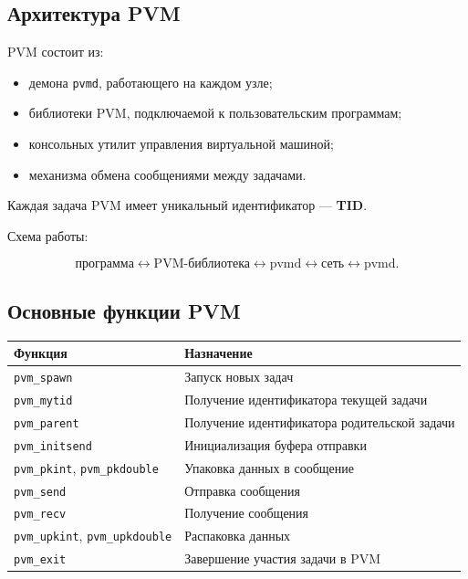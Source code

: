 \documentclass[12pt,a4paper]{article}
\begin{document}
\subsection{Архитектура PVM}

PVM состоит из:
\begin{itemize}
    \item демона \texttt{pvmd}, работающего на каждом узле;
    \item библиотеки PVM, подключаемой к пользовательским программам;
    \item консольных утилит управления виртуальной машиной;
    \item механизма обмена сообщениями между задачами.
\end{itemize}

Каждая задача PVM имеет уникальный идентификатор --- \textbf{TID}.

Схема работы:

\[
\text{программа} \leftrightarrow \text{PVM-библиотека} \leftrightarrow \text{pvmd} \leftrightarrow \text{сеть} \leftrightarrow \text{pvmd}.
\]

\subsection{Основные функции PVM}

\begin{center}
\begin{tabular}{|p{5cm}|p{9cm}|}
\hline
\textbf{Функция} & \textbf{Назначение} \\
\hline
\texttt{pvm\_spawn} & Запуск новых задач \\
\hline
\texttt{pvm\_mytid} & Получение идентификатора текущей задачи \\
\hline
\texttt{pvm\_parent} & Получение идентификатора родительской задачи \\
\hline
\texttt{pvm\_initsend} & Инициализация буфера отправки \\
\hline
\texttt{pvm\_pkint}, \texttt{pvm\_pkdouble} & Упаковка данных в сообщение \\
\hline
\texttt{pvm\_send} & Отправка сообщения \\
\hline
\texttt{pvm\_recv} & Получение сообщения \\
\hline
\texttt{pvm\_upkint}, \texttt{pvm\_upkdouble} & Распаковка данных \\
\hline
\texttt{pvm\_exit} & Завершение участия задачи в PVM \\
\hline
\end{tabular}
\end{center}
\end{document}
